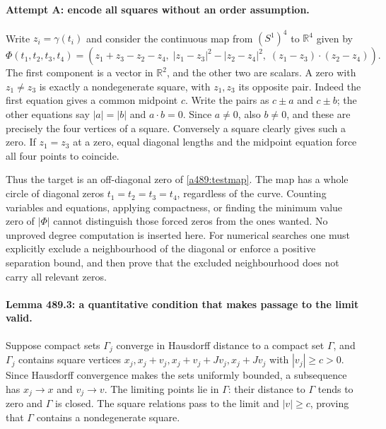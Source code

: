 \documentclass[11pt]{article}
\begin{document}
\paragraph{Attempt A: encode all squares without an order assumption.}
Write $z_i=\gamma(t_i)$ and consider the continuous map from $(S^1)^4$
to $\mathbb R^4$ given by
\begin{equation}\label{a489:testmap}
 \Phi(t_1,t_2,t_3,t_4)=
 \left(z_1+z_3-z_2-z_4,\;
       |z_1-z_3|^2-|z_2-z_4|^2,\;
       (z_1-z_3)\cdot(z_2-z_4)\right).
\end{equation}
The first component is a vector in $\mathbb R^2$, and the other two
are scalars. A zero with $z_1\ne z_3$ is exactly a nondegenerate square,
with $z_1,z_3$ its opposite pair. Indeed the first equation gives a common
midpoint $c$. Write the pairs as $c\pm a$ and $c\pm b$; the other
equations say $|a|=|b|$ and $a\cdot b=0$. Since $a\ne0$, also $b\ne0$,
and these are precisely the four vertices of a square. Conversely a square
clearly gives such a zero. If $z_1=z_3$ at a zero, equal diagonal lengths
and the midpoint equation force all four points to coincide.

Thus the target is an off-diagonal zero of \eqref{a489:testmap}. The map
has a whole circle of diagonal zeros $t_1=t_2=t_3=t_4$, regardless of the
curve. Counting variables and equations, applying compactness, or finding
the minimum value zero of $|\Phi|$ cannot distinguish those forced zeros
from the ones wanted. No unproved degree computation is inserted here.
For numerical searches one must explicitly exclude a neighbourhood of the
diagonal or enforce a positive separation bound, and then prove that the
excluded neighbourhood does not carry all relevant zeros.

\paragraph{Lemma 489.3: a quantitative condition that makes passage to the limit valid.}
Suppose compact sets $\Gamma_j$ converge in Hausdorff distance to a
compact set $\Gamma$, and $\Gamma_j$ contains square vertices
$x_j,x_j+v_j,x_j+v_j+Jv_j,x_j+Jv_j$ with $|v_j|\ge c>0$.
Since Hausdorff convergence makes the sets uniformly bounded, a subsequence
has $x_j\to x$ and $v_j\to v$. The limiting points lie in $\Gamma$:
their distance to $\Gamma$ tends to zero and $\Gamma$ is closed.
The square relations pass to the limit and $|v|\ge c$, proving that
$\Gamma$ contains a nondegenerate square.
\end{document}
